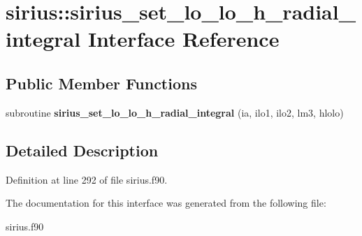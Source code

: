 \hypertarget{interfacesirius_1_1sirius__set__lo__lo__h__radial__integral}{}\section{sirius\+:\+:sirius\+\_\+set\+\_\+lo\+\_\+lo\+\_\+h\+\_\+radial\+\_\+integral Interface Reference}
\label{interfacesirius_1_1sirius__set__lo__lo__h__radial__integral}
\subsection*{Public Member Functions}
\begin{DoxyCompactItemize}
\item 
\hypertarget{interfacesirius_1_1sirius__set__lo__lo__h__radial__integral_a23cc8526e665b27e1f99ae475f913faa}{}subroutine {\bfseries sirius\+\_\+set\+\_\+lo\+\_\+lo\+\_\+h\+\_\+radial\+\_\+integral} (ia, ilo1, ilo2, lm3, hlolo)\label{interfacesirius_1_1sirius__set__lo__lo__h__radial__integral_a23cc8526e665b27e1f99ae475f913faa}

\end{DoxyCompactItemize}


\subsection{Detailed Description}


Definition at line 292 of file sirius.\+f90.



The documentation for this interface was generated from the following file\+:\begin{DoxyCompactItemize}
\item 
sirius.\+f90\end{DoxyCompactItemize}
